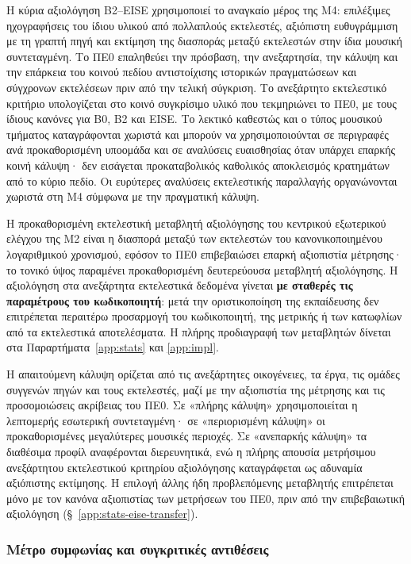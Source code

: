 \documentclass[11pt,a4paper]{article}
\begin{document}
Η κύρια αξιολόγηση B2--EISE χρησιμοποιεί το αναγκαίο μέρος της M4: επιλέξιμες ηχογραφήσεις του ίδιου υλικού από πολλαπλούς εκτελεστές, αξιόπιστη ευθυγράμμιση με τη γραπτή πηγή και εκτίμηση της διασποράς μεταξύ εκτελεστών στην ίδια μουσική συντεταγμένη. Το ΠΕ0 επαληθεύει την πρόσβαση, την ανεξαρτησία, την κάλυψη και την επάρκεια του κοινού πεδίου αντιστοίχισης ιστορικών πραγματώσεων και σύγχρονων εκτελέσεων πριν από την τελική σύγκριση. Το ανεξάρτητο εκτελεστικό κριτήριο υπολογίζεται στο κοινό συγκρίσιμο υλικό που τεκμηριώνει το ΠΕ0, με τους ίδιους κανόνες για B0, B2 και EISE. Το λεκτικό καθεστώς και ο τύπος μουσικού τμήματος καταγράφονται χωριστά και μπορούν να χρησιμοποιούνται σε περιγραφές ανά προκαθορισμένη υποομάδα και σε αναλύσεις ευαισθησίας όταν υπάρχει επαρκής κοινή κάλυψη· δεν εισάγεται προκαταβολικός καθολικός αποκλεισμός κρατημάτων από το κύριο πεδίο. Οι ευρύτερες αναλύσεις εκτελεστικής παραλλαγής οργανώνονται χωριστά στη M4 σύμφωνα με την πραγματική κάλυψη.

Η προκαθορισμένη εκτελεστική μεταβλητή αξιολόγησης του κεντρικού εξωτερικού ελέγχου της M2 είναι η διασπορά μεταξύ των εκτελεστών του κανονικοποιημένου λογαριθμικού χρονισμού, εφόσον το ΠΕ0 επιβεβαιώσει επαρκή αξιοπιστία μέτρησης· το τονικό ύψος παραμένει προκαθορισμένη δευτερεύουσα μεταβλητή αξιολόγησης. Η αξιολόγηση στα ανεξάρτητα εκτελεστικά δεδομένα γίνεται \textbf{με σταθερές τις παραμέτρους του κωδικοποιητή}: μετά την οριστικοποίηση της εκπαίδευσης δεν επιτρέπεται περαιτέρω προσαρμογή του κωδικοποιητή, της μετρικής ή των κατωφλίων από τα εκτελεστικά αποτελέσματα. Η πλήρης προδιαγραφή των μεταβλητών δίνεται στα Παραρτήματα~\ref{app:stats} και \ref{app:impl}.

Η απαιτούμενη κάλυψη ορίζεται από τις ανεξάρτητες οικογένειες, τα έργα, τις ομάδες συγγενών πηγών και τους εκτελεστές, μαζί με την αξιοπιστία της μέτρησης και τις προσομοιώσεις ακρίβειας του ΠΕ0. Σε «πλήρης κάλυψη» χρησιμοποιείται η λεπτομερής εσωτερική συντεταγμένη· σε «περιορισμένη κάλυψη» οι προκαθορισμένες μεγαλύτερες μουσικές περιοχές. Σε «ανεπαρκής κάλυψη» τα διαθέσιμα προφίλ αναφέρονται διερευνητικά, ενώ η πλήρης απουσία μετρήσιμου ανεξάρτητου εκτελεστικού κριτηρίου αξιολόγησης καταγράφεται ως αδυναμία αξιόπιστης εκτίμησης. Η επιλογή άλλης ήδη προβλεπόμενης μεταβλητής επιτρέπεται μόνο με τον κανόνα αξιοπιστίας των μετρήσεων του ΠΕ0, πριν από την επιβεβαιωτική αξιολόγηση (§~\ref{app:stats-eise-transfer}).

\subsubsection{Μέτρο συμφωνίας και συγκριτικές αντιθέσεις}
\end{document}
